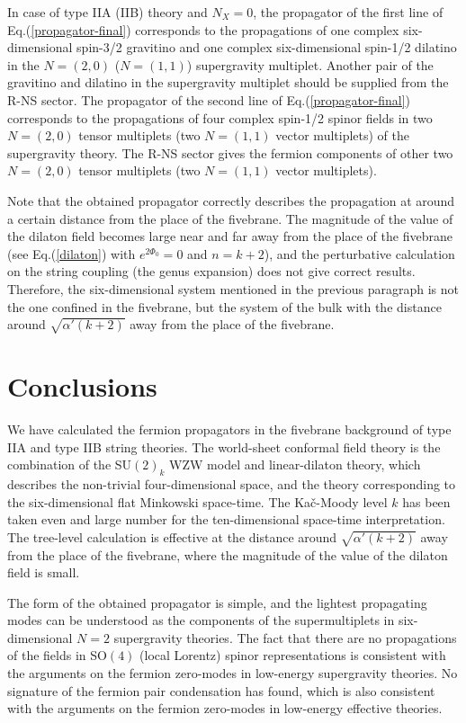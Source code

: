 \documentclass[a4paper,prd,preprint]{revtex4}
\begin{document}
In case of type IIA (IIB) theory and $N_X=0$,
 the propagator of the first line of Eq.(\ref{propagator-final})
 corresponds to the propagations of
 one complex six-dimensional spin-3/2 gravitino
 and one complex six-dimensional spin-1/2 dilatino
 in the $N=(2,0)$ ($N=(1,1)$) supergravity multiplet.
Another pair of the gravitino and dilatino
 in the supergravity multiplet
 should be supplied from the R-NS sector.
The propagator of the second line of Eq.(\ref{propagator-final})
 corresponds to the propagations of four complex spin-1/2 spinor fields
 in two $N=(2,0)$ tensor multiplets (two $N=(1,1)$ vector multiplets)
 of the supergravity theory.
The R-NS sector gives
 the fermion components of other two $N=(2,0)$ tensor multiplets
 (two $N=(1,1)$ vector multiplets).

Note that the obtained propagator
 correctly describes the propagation
 at around a certain distance from the place of the fivebrane.
The magnitude of the value of the dilaton field
 becomes large near and far away from the place of the fivebrane
 (see Eq.(\ref{dilaton}) with $e^{2\Phi_0}=0$ and $n=k+2$),
 and the perturbative calculation on the string coupling
 (the genus expansion) does not give correct results.
Therefore,
 the six-dimensional system mentioned in the previous paragraph
 is not the one confined in the fivebrane,
 but the system of the bulk with the distance around
 $\sqrt{\alpha'(k+2)}$ away from the place of the fivebrane.

\section{Conclusions}
\label{sec:conclusions}

We have calculated the fermion propagators
 in the fivebrane background of type IIA and type IIB string theories.
The world-sheet conformal field theory is the combination of
 the SU$(2)_k$ WZW model and linear-dilaton theory,
 which describes the non-trivial four-dimensional space,
 and the theory corresponding to the six-dimensional
 flat Minkowski space-time.
The Ka\v c-Moody level $k$
 has been taken even and large number
 for the ten-dimensional space-time interpretation.
The tree-level calculation is effective
 at the distance around $\sqrt{\alpha'(k+2)}$ away
 from the place of the fivebrane,
 where the magnitude of the value of the dilaton field is small.

The form of the obtained propagator is simple,
 and the lightest propagating modes can be understood
 as the components of the supermultiplets in six-dimensional
 $N=2$ supergravity theories.
The fact that
 there are no propagations of the fields
 in SO$(4)$ (local Lorentz) spinor representations
 is consistent with the arguments on the fermion zero-modes
 in low-energy supergravity theories.
No signature of the fermion pair condensation has found,
 which is also consistent with the arguments on the fermion zero-modes
 in low-energy effective theories.
\end{document}

